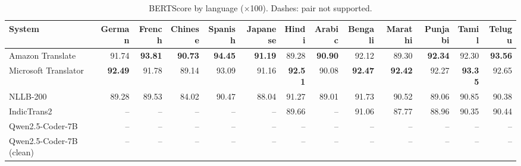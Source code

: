 \begin{table}[t]
\centering
\caption{BERTScore by language ($\times$100). Dashes: pair not supported.\label{tab:bertscore_lang}}
\begin{tabular}{lrrrrrrrrrrrr}
\toprule
System & German & French & Chinese & Spanish & Japanese & Hindi & Arabic & Bengali & Marathi & Punjabi & Tamil & Telugu \\
\midrule
Amazon Translate & 91.74 & \textbf{93.81} & \textbf{90.73} & \textbf{94.45} & \textbf{91.19} & 89.28 & \textbf{90.90} & 92.12 & 89.30 & \textbf{92.34} & 92.30 & \textbf{93.56} \\
Microsoft Translator & \textbf{92.49} & 91.78 & 89.14 & 93.09 & 91.16 & \textbf{92.51} & 90.08 & \textbf{92.47} & \textbf{92.42} & 92.27 & \textbf{93.35} & 92.65 \\
NLLB-200 & 89.28 & 89.53 & 84.02 & 90.47 & 88.04 & 91.27 & 89.01 & 91.73 & 90.52 & 89.06 & 90.85 & 90.38 \\
IndicTrans2 & -- & -- & -- & -- & -- & 89.66 & -- & 91.06 & 87.77 & 88.96 & 90.35 & 90.44 \\
Qwen2.5-Coder-7B & -- & -- & -- & -- & -- & -- & -- & -- & -- & -- & -- & -- \\
Qwen2.5-Coder-7B (clean) & -- & -- & -- & -- & -- & -- & -- & -- & -- & -- & -- & -- \\
\bottomrule
\end{tabular}
\end{table}
